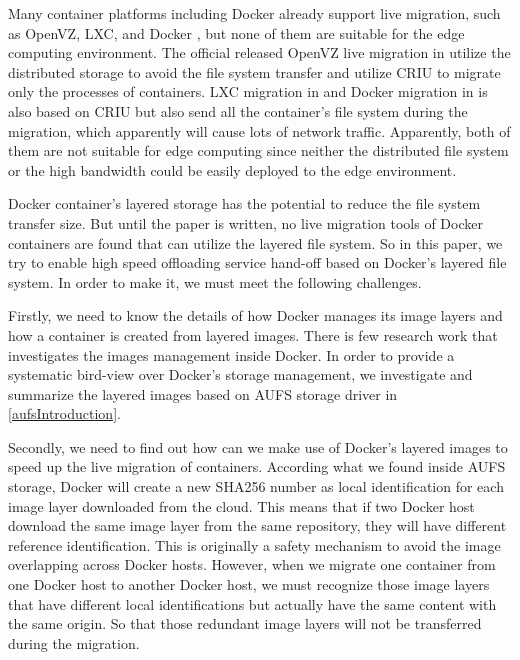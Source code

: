 Many container platforms including Docker already support live migration, such as OpenVZ\cite{openvz}, LXC\cite{qiu2016evaluating}, and Docker \cite{phaul,boucherPhaul}, but none of them are suitable for the edge computing environment. The official released OpenVZ live migration in \cite{phaul} utilize the distributed storage to avoid the file system transfer and utilize CRIU \cite{criu} to migrate only the processes of containers.
LXC migration in \cite{qiu2016evaluating} and Docker migration in \cite{phaul, boucherPhaul} is also based on CRIU but also send all the container's file system during the migration, which apparently will cause lots of network traffic. Apparently, both of them are not suitable for edge computing since neither the distributed file system or the high bandwidth could be easily deployed to the edge environment.

Docker container's layered storage has the potential to reduce the file system transfer size. But until the paper is written, no live migration tools of Docker containers are found that can utilize the layered file system. 
So in this paper, we try to enable high speed offloading service hand-off based on Docker's layered file system. In order to make it, we must meet the following challenges.

Firstly, we need to know the details of how Docker manages its image layers and how a container is created from layered images. There is few research work that investigates the images management inside Docker. In order to provide a systematic bird-view over Docker's storage management, we investigate and summarize the layered images based on AUFS storage driver in \ref{aufsIntroduction}.

Secondly, we need to find out how can we make use of Docker's layered images to speed up the live migration of containers. According what we found inside AUFS storage, Docker will create a new SHA256 number as local  identification for each image layer downloaded from the cloud. 
This means that if two Docker host download the same image layer from the same repository, they will have different reference identification. This is originally a safety mechanism to avoid the image overlapping across Docker hosts\cite{dockerlayer}. 
However, when we migrate one container from one Docker host to another Docker host, we must recognize those image layers that have different local identifications but actually have the same content with the same origin. So that those redundant image layers will not be transferred during the migration.

